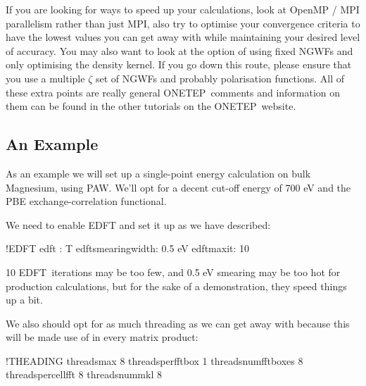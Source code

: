 \documentclass[letterpaper,10pt,english]{sphinxmanual}
\begin{document}
If you are looking for ways to speed up your calculations, look at
OpenMP / MPI parallelism rather than just MPI, also try to optimise your
convergence criteria to have the lowest values you can get away with
while maintaining your desired level of accuracy. You may also want to
look at the option of using fixed NGWFs and only optimising the density
kernel. If you go down this route, please ensure that you use a multiple
\(\zeta\) set of NGWFs and probably polarisation functions. All of
these extra points are really general ONETEP comments and information on
them can be found in the other tutorials on the ONETEP website.


\subsection{An Example}
\label{\detokenize{AQUA-FOE:an-example}}
As an example we will set up a single-point energy calculation on bulk
Magnesium, using PAW. We’ll opt for a decent cut-off energy of 700 eV
and the PBE exchange-correlation functional.

%
\begin{sphinxVerbatim}[commandchars=\\\{\}]
 
  
 
 
  
\end{sphinxVerbatim}

We need to enable EDFT and set it up as we have described:

%
\begin{sphinxVerbatim}[commandchars=\\\{\}]
!EDFT
edft : T
edft\PYGZus{}smearing\PYGZus{}width: 0.5 eV
edft\PYGZus{}maxit: 10
\end{sphinxVerbatim}

10 EDFT iterations may be too few, and 0.5 eV smearing may be too hot
for production calculations, but for the sake of a demonstration, they
speed things up a bit.

We also should opt for as much threading as we can get away with because
this will be made use of in every matrix product:

%
\begin{sphinxVerbatim}[commandchars=\\\{\}]
!THEADING
threadsmax 8
threadsperfftbox 1
threadsnumfftboxes 8
threadspercellfft 8
threadsnummkl 8
\end{sphinxVerbatim}
\end{document}
